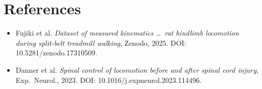 \documentclass[11pt]{article}
\begin{document}
\section{References}
\label{sec:refs}

\begin{itemize}
  \item Fujiki et al. \emph{Dataset of measured kinematics \ldots\ rat hindlimb
        locomotion during split-belt treadmill walking}, Zenodo, 2025.
        DOI: 10.5281/zenodo.17310509.
  \item Danner et al. \emph{Spinal control of locomotion before and after
        spinal cord injury}, Exp.\ Neurol., 2023. DOI: 10.1016/j.expneurol.2023.114496.
\end{itemize}
\end{document}
